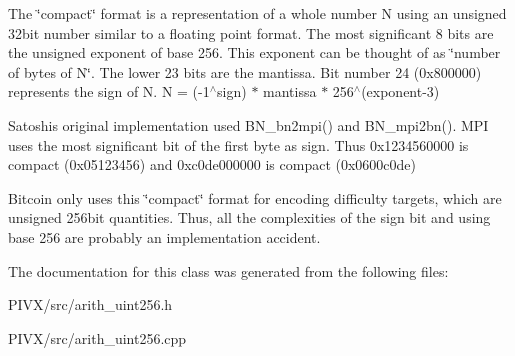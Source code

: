 The \char`\"{}compact\char`\"{} format is a representation of a whole number N using an unsigned 32bit number similar to a floating point format. The most significant 8 bits are the unsigned exponent of base 256. This exponent can be thought of as \char`\"{}number of bytes of N\char`\"{}. The lower 23 bits are the mantissa. Bit number 24 (0x800000) represents the sign of N. N = (-\/1$^\wedge$sign) $\ast$ mantissa $\ast$ 256$^\wedge$(exponent-\/3)

Satoshi\textquotesingle{}s original implementation used B\+N\+\_\+bn2mpi() and B\+N\+\_\+mpi2bn(). M\+PI uses the most significant bit of the first byte as sign. Thus 0x1234560000 is compact (0x05123456) and 0xc0de000000 is compact (0x0600c0de)

Bitcoin only uses this \char`\"{}compact\char`\"{} format for encoding difficulty targets, which are unsigned 256bit quantities. Thus, all the complexities of the sign bit and using base 256 are probably an implementation accident. 

The documentation for this class was generated from the following files\+:\begin{DoxyCompactItemize}
\item 
P\+I\+V\+X/src/arith\+\_\+uint256.\+h\item 
P\+I\+V\+X/src/arith\+\_\+uint256.\+cpp\end{DoxyCompactItemize}

